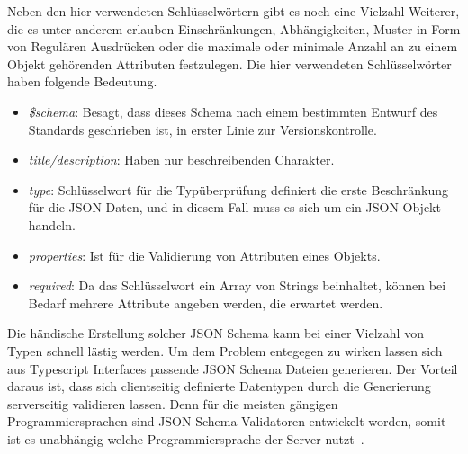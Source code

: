Neben den hier verwendeten Schlüsselwörtern gibt es noch eine Vielzahl Weiterer, die es unter anderem erlauben Einschränkungen, Abhängigkeiten,
Muster in Form von Regulären Ausdrücken oder die maximale oder minimale Anzahl an zu einem Objekt gehörenden Attributen festzulegen.
Die hier verwendeten Schlüsselwörter haben folgende Bedeutung.

\begin{itemize}
    \item \emph{\$schema}: Besagt, dass dieses Schema nach einem bestimmten Entwurf des Standards geschrieben ist, in erster Linie zur Versionskontrolle.
    \item \emph{title/description}: Haben nur beschreibenden Charakter.
    \item \emph{type}: Schlüsselwort für die Typüberprüfung definiert die erste Beschränkung für die JSON-Daten, und in diesem Fall muss es sich um ein JSON-Objekt handeln.
    \item \emph{properties}: Ist für die Validierung von Attributen eines Objekts.
    \item \emph{required}: Da das Schlüsselwort ein Array von Strings beinhaltet, können bei Bedarf mehrere Attribute angeben werden, die erwartet werden.
\end{itemize}

Die händische Erstellung solcher JSON Schema kann bei einer Vielzahl von Typen schnell lästig werden.
Um dem Problem entegegen zu wirken lassen sich aus Typescript Interfaces passende JSON Schema Dateien generieren.
Der Vorteil daraus ist, dass sich clientseitig definierte Datentypen durch die Generierung serverseitig validieren lassen.
Denn für die meisten gängigen Programmiersprachen sind JSON Schema Validatoren entwickelt worden, somit ist es unabhängig welche Programmiersprache der Server nutzt~\cite{json-schema-implementations}.


